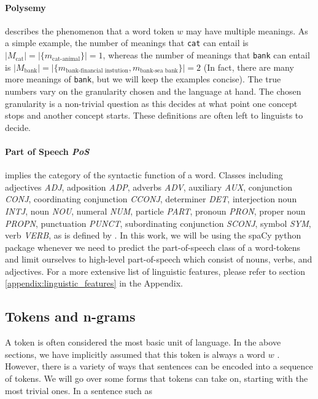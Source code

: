 \documentclass[a4paper,12pt,oneside,openright]{report}
\begin{document}
\paragraph{Polysemy} describes the phenomenon that a word token $w$ may have multiple meanings.
As a simple example, the number of meanings that \Verb#cat# can entail is $ | M_\text{cat} | = | \{ m_\text{cat-animal} \} |  = 1$, whereas the number of meanings that \Verb#bank# can entail is $ | M_\text{bank} | = | \{ m_\text{bank-financial instution},  m_\text{bank-sea bank}\} |  = 2$ (In fact, there are many more meanings of \texttt{bank}, but we will keep the examples concise).
The true numbers vary on the granularity chosen and the language at hand. 
The chosen granularity is a non-trivial question as this decides at what point one concept stops and another concept starts.
These definitions are often left to linguists to decide. \\

\paragraph{Part of Speech \textit{PoS}} implies the category of the syntactic function of a word.
Classes including adjectives \textit{ADJ}, adposition \textit{ADP}, adverbs \textit{ADV}, auxiliary \textit{AUX}, conjunction \textit{CONJ}, coordinating conjunction \textit{CCONJ}, determiner \textit{DET}, interjection noun \textit{INTJ}, noun \textit{NOU}, numeral \textit{NUM}, particle \textit{PART}, pronoun \textit{PRON}, proper noun \textit{PROPN}, punctuation \textit{PUNCT}, subordinating conjunction \textit{SCONJ}, symbol \textit{SYM}, verb \textit{VERB}, as is defined by \cite{spacyb}.
In this work, we will be using the spaCy python package  \cite{spacy} whenever we need to predict the part-of-speech class of a word-tokens and limit ourselves to high-level part-of-speech which consist of nouns, verbs, and adjectives.
For a more extensive list of linguistic features, please refer to section \ref{appendix:linguistic_features} in the Appendix.


\subsection{Tokens and n-grams}

A token is often considered the most basic unit of language.
In the above sections, we have implicitly assumed that this token is always a word $w$ . 
However, there is a variety of ways that sentences can be encoded into a sequence of tokens.
We will go over some forms that tokens can take on, starting with the most trivial ones.
In a sentence such as
\end{document}
